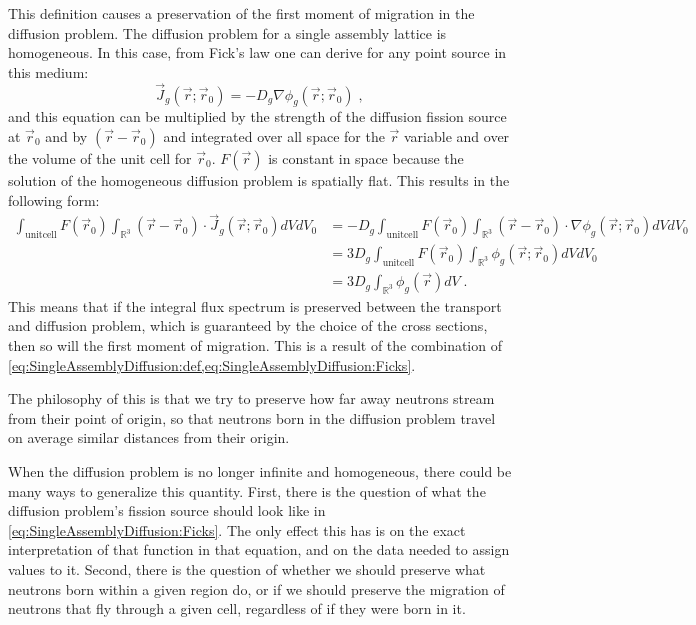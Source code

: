 \documentclass[a4paper,letterpaper,12pt,oneside,draft]{article}
\newcommand{\eec}{\;,}
\newcommand{\eep}{\;.}
\newcommand{\allspace}{\ensuremath{\mathbb{R}^3}}
\newcommand{\vr}{\ensuremath{\vec{r}}}
\newcommand{\dvr}{\left(\vr-\vr_0\right)}
\begin{document}
This definition causes a preservation of the first moment of migration in the diffusion problem.
The diffusion problem for a single assembly lattice is homogeneous. 
In this case, from Fick's law one can derive for any point source in this medium:
\begin{equation}
    \vec{J}_g(\vr;\vr_0) = -D_g\nabla\phi_g(\vr;\vr_0)\eec
\end{equation}
and this equation can be multiplied by the strength of the diffusion fission source at $\vr_0$ and by $\dvr$ and integrated over all space for the $\vr$ variable and over the volume of the unit cell for $\vr_0$. 
$F(\vr)$ is constant in space because the solution of the homogeneous diffusion problem is spatially flat.
This results in the following form:
\begin{align}
    \nonumber
    \int_{\text{unitcell}} F(\vr_0)\int_{\allspace} \dvr\cdot\vec{J}_g(\vr;\vr_0) dVdV_0 &= -D_g \int_{\text{unitcell}} F(\vr_0) \int_{\allspace} \dvr\cdot\nabla \phi_g(\vr;\vr_0)dVdV_0 \\\nonumber
    &= 3D_g \int_{\text{unitcell}} F(\vr_0) \int_{\allspace}\phi_g(\vr;\vr_0)dVdV_0 \\
    \label{eq:SingleAssemblyDiffusion:Ficks}
    &= 3D_g \int_{\allspace}\phi_g(\vr)dV\eep
\end{align}
This means that if the integral flux spectrum is preserved between the transport and diffusion problem, which is guaranteed by the choice of the cross sections, then so will the first moment of migration.
This is a result of the combination of \cref{eq:SingleAssemblyDiffusion:def,eq:SingleAssemblyDiffusion:Ficks}.

The philosophy of this is that we try to preserve how far away neutrons stream from their point of origin, so that neutrons born in the diffusion problem travel on average similar distances from their origin.

When the diffusion problem is no longer infinite and homogeneous, there could be many ways to generalize this quantity.
First, there is the question of what the diffusion problem's fission source should look like in \cref{eq:SingleAssemblyDiffusion:Ficks}.
The only effect this has is on the exact interpretation of that function in that equation, and on the data needed to assign values to it.
Second, there is the question of whether we should preserve what neutrons born within a given region do, or if we should preserve the migration of neutrons that fly through a given cell, regardless of if they were born in it.
\end{document}
